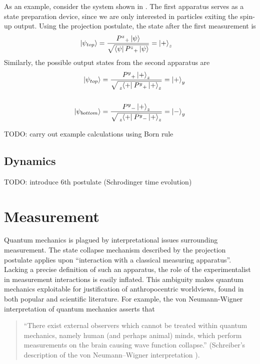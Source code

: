 As an example, consider the system shown in . The first apparatus serves as a state preparation device, since we are only interested in particles exiting the spin-up output. Using the projection postulate, the state after the first measurement is
\begin{align}
    \ket{\psi_{top}} &= \frac{{P^z}_+\ket{\psi}}{\sqrt{\bra{\psi}{P^z}_+\ket{\psi}}} = \ket{+}_z
\end{align}
Similarly, the possible output states from the second apparatus are
\begin{align}
    \ket{\psi_{top}} &= \frac{{P^y}_+\ket{+}_z}{\sqrt{\tensor[_z]{\bra{+}}{}{P^y}_+\ket{+}_z}} = \ket{+}_y \\ \\
    \ket{\psi_{bottom}} &= \frac{{P^y}_-\ket{+}_z}{\sqrt{\tensor[_z]{\bra{+}}{}{P^y}_-\ket{+}_z}} = \ket{-}_y
\end{align}

TODO: carry out example calculations using Born rule

\section{Dynamics}
TODO: introduce 6th postulate (Schrodinger time evolution)

\chapter{Measurement}

Quantum mechanics is plagued by interpretational issues surrounding measurement. The state collapse mechanism described by the projection postulate applies upon ``interaction with a classical measuring apparatus''. Lacking a precise definition of such an apparatus, the role of the experimentalist in measurement interactions is  easily inflated. This ambiguity makes quantum mechanics exploitable for justification of anthropocentric worldviews, found in both popular and scientific literature. For example, the von Neumann-Wigner interpretation of quantum mechanics asserts that
\begin{quote}
  ``There exist external observers which cannot be treated within quantum mechanics, namely human (and perhaps animal) minds, which perform measurements on the brain causing wave function collapse.'' (Schreiber's description of the von Neumann–Wigner interpretation \cite{Schreiber}).
\end{quote}

